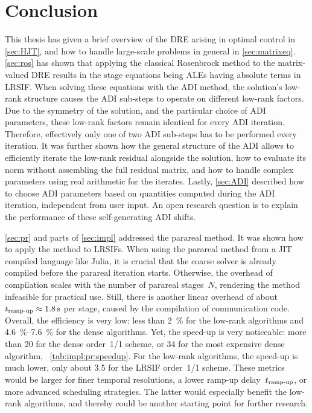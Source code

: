 \chapter{Conclusion}
\label{sec:conclusion}


This thesis has given a brief overview of the \ac{DRE} arising in optimal control in \autoref{sec:HJT},
and how to handle large-scale problems in general in \autoref{sec:matrixeq}.
\autoref{sec:ros} has shown that
applying the classical Rosenbrock method to the matrix-valued \ac{DRE}
results in the stage equations being \acp{ALE}
having absolute terms in \ac{LRSIF}.
When solving these equations with the \ac{ADI} method,
the solution's low-rank structure causes the \ac{ADI} sub-steps to operate on different low-rank factors.
Due to the symmetry of the solution,
and the particular choice of \ac{ADI} parameters,
these low-rank factors remain identical for every \ac{ADI} iteration.
Therefore, effectively only one of two \ac{ADI} sub-steps has to be performed every iteration.
It was further shown how the general structure of the \ac{ADI} allows to efficiently iterate the low-rank residual alongside the solution,
how to evaluate its norm without assembling the full residual matrix,
and how to handle complex parameters using real arithmetic for the iterates.
Lastly, \autoref{sec:ADI} described how to choose \ac{ADI} parameters based on quantities computed during the \ac{ADI} iteration,
\ie independent from user input.
An open research question is to explain the performance of these self-generating \ac{ADI} shifts.

\autoref{sec:pr} and parts of \autoref{sec:impl} addressed the parareal method.
It was shown how to apply the method to \acp{LRSIF}.
When using the parareal method from a \ac{JIT} compiled language like Julia,
it is crucial that the coarse solver is already compiled before the parareal iteration starts.
Otherwise, the overhead of compilation scales with the number of parareal stages~$N$,
rendering the method infeasible for practical use.
Still, there is another linear overhead of about $t_\text{ramp-up} \approx \SI{1.8}{\second}$ per stage,
caused by the compilation of communication code.
Overall, the efficiency is very low:
less than \SI{2}{\percent} for the low-rank algorithms and
\SIrange{4.6}{7.6}{\percent} for the dense algorithms.
Yet, the speed-up is very noticeable:
\eg more than \num{20} for the dense order~1/1 scheme,
or \num{34} for the most expensive dense algorithm,
\cf~\autoref{tab:impl:pr:speedup}.
For the low-rank algorithms,
the speed-up is much lower,
\ie only about \num{3.5} for the \ac{LRSIF} order~1/1 scheme.
These metrics would be larger for finer temporal resolutions,
a lower ramp-up delay~$t_\text{ramp-up}$,
or more advanced scheduling strategies.
The latter would especially benefit the low-rank algorithms,
and thereby could be another starting point for further research.

